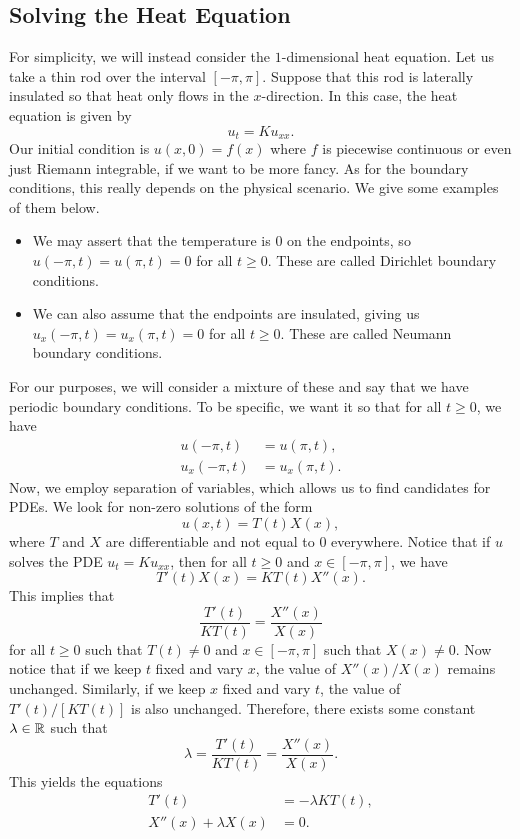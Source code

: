 \subsection{Solving the Heat Equation} \label{subsec:1.2}
For simplicity, we will instead consider the $1$-dimensional heat equation. 
Let us take a thin rod over the interval $[-\pi, \pi]$. Suppose that this 
rod is laterally insulated so that heat only flows in the $x$-direction. 
In this case, the heat equation is given by 
\[ u_t = K u_{xx}. \] 
Our initial condition is $u(x, 0) = f(x)$ where $f$ is piecewise continuous
or even just Riemann integrable, if we want to be more fancy. As for the 
boundary conditions, this really depends on the physical scenario. We give 
some examples of them below.
\begin{itemize}
    \item We may assert that the temperature is $0$ on the endpoints, so
    $u(-\pi, t) = u(\pi, t) = 0$ for all $t \geq 0$. These are called 
    Dirichlet boundary conditions.
    \item We can also assume that the endpoints are insulated, giving us 
    $u_x(-\pi, t) = u_x(\pi, t) = 0$ for all $t \geq 0$. These are called 
    Neumann boundary conditions.
\end{itemize}
For our purposes, we will consider a mixture of these and say that we have 
periodic boundary conditions. To be specific, we want it so that for all 
$t \geq 0$, we have 
\begin{align*}
    u(-\pi, t) &= u(\pi, t), \\ 
    u_x(-\pi, t) &= u_x(\pi, t).
\end{align*}
Now, we employ separation of variables, which allows us to find candidates for
PDEs. We look for non-zero solutions of the form 
\[ u(x, t) = T(t) X(x), \] 
where $T$ and $X$ are differentiable and not equal to $0$ everywhere. 
Notice that if $u$ solves the PDE $u_t = Ku_{xx}$, then for all 
$t \geq 0$ and $x \in [-\pi, \pi]$, we have 
\[ T'(t)X(x) = KT(t)X''(x). \] 
This implies that 
\[ \frac{T'(t)}{KT(t)} = \frac{X''(x)}{X(x)} \] 
for all $t \geq 0$ such that $T(t) \neq 0$ and $x \in [-\pi, \pi]$ such that 
$X(x) \neq 0$. Now notice that if we keep $t$ fixed and vary $x$, the value 
of $X''(x)/X(x)$ remains unchanged. Similarly, if we keep $x$ fixed and 
vary $t$, the value of $T'(t)/[KT(t)]$ is also unchanged. Therefore, 
there exists some constant $\lambda \in \mathbb{R}$ such that 
\[ \lambda = \frac{T'(t)}{KT(t)} = \frac{X''(x)}{X(x)}. \] 
This yields the equations
\begin{align}
    T'(t) &= -\lambda KT(t), \label{eq:1.3} \\ 
    X''(x) + \lambda X(x) &= 0. \label{eq:1.4}
\end{align}
